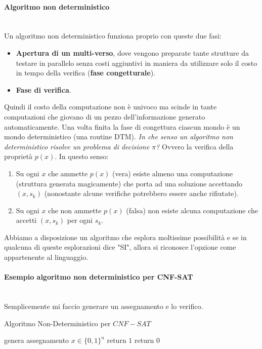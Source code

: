 \documentclass{article}
\begin{document}
\paragraph{Algoritmo non deterministico}\mbox{}\\
Un algoritmo non deterministico funziona proprio con queste due fasi:
\begin{itemize}
    \item \textbf{Apertura di un multi-verso}, dove vengono preparate tante strutture
          da testare in parallelo senza costi aggiuntivi in maniera da utilizzare
          solo il costo in tempo della verifica (\textbf{fase congetturale}).
    \item \textbf{Fase di verifica}.
\end{itemize}
Quindi il costo della computazione non è univoco ma scinde in tante computazioni che
giovano di un pezzo dell'informazione generato automaticamente. Una volta finita la fase
di congettura ciascun mondo è un mondo deterministico (una routine DTM).
\textit{In che senso un algoritmo non deterministico risolve un problema
    di decisione $\pi$?} Ovvero la verifica della proprietà $p(x)$.
In questo senso:
\begin{enumerate}
    \item Su ogni $x$ che ammette $p(x)$ (vera) esiste
          almeno una computazione (struttura generata magicamente) che porta ad una
          soluzione accettando $(x,s_k)$ (nonostante alcune verifiche potrebbero
          essere anche rifiutate).

    \item Su ogni $x$ che non ammette $p(x)$ (falsa) non esiste alcuna
          computazione che accetti $(x,s_k)$ per ogni $s_k$.
\end{enumerate}
Abbiamo a disposizione un algoritmo che esplora moltissime possibilità e se in qualcuna
di queste esplorazioni dice "SI", allora si riconosce l'opzione come appartenente
al linguaggio.
\paragraph{Esempio algoritmo non deterministico per CNF-SAT}\mbox{}\\
Semplicemente mi faccio generare un assegnamento e lo verifico.
\begin{algorithm}[hbt!]
    \caption{Algoritmo Non-Deterministico per $CNF-SAT$}\label{alg:ntm-cnf}
    genera assegnamento $x\in\{0,1\}^n$\;
        {
            return $1$\;
        }
    return $0$\;
\end{algorithm}
\end{document}

